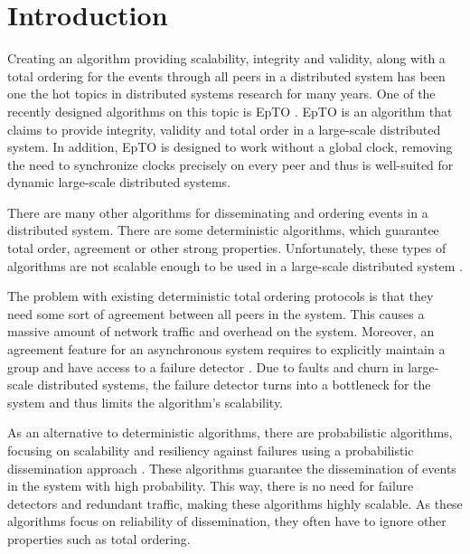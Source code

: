 \documentclass[10pt,conference,a4paper]{IEEEtran}
\begin{document}
\section{Introduction}
Creating an algorithm providing scalability, integrity and validity, along with a total ordering for the events through all peers in a distributed system has been one the hot topics in distributed systems research for many years. One of the recently designed algorithms on this topic is EpTO \autocite{matos2015epto}. EpTO is an algorithm that claims to provide integrity, validity and total order in a large-scale distributed system. In addition, EpTO is designed to work without a global clock, removing the need to synchronize clocks precisely on every peer and thus is well-suited for dynamic large-scale distributed systems.
\par 
There are many other algorithms for disseminating and ordering events in a distributed system. There are some deterministic algorithms, which guarantee total order, agreement or other strong properties. Unfortunately, these types of algorithms are not scalable enough to be used in a large-scale distributed system \autocites[]{defago2004total}[]{lamport1978time}.
\par
The problem with existing deterministic total ordering protocols is that they need some sort of agreement between all peers in the system. This causes a massive amount of network traffic and overhead on the system.
Moreover, an agreement feature for an asynchronous system requires to
explicitly maintain a group and have access to a failure detector \autocites[]{chandra1996weakest}[]{chandra1996unreliable}. Due to faults and churn in large-scale distributed systems, the failure detector turns into a bottleneck for the system and thus limits the algorithm's scalability.
\par
As an alternative to deterministic algorithms, there are probabilistic algorithms, focusing on scalability and resiliency against failures using a probabilistic dissemination approach \autocites []{birman1999bimodal}[]{carvalho2007emergent}[]{demers1987epidemic}[]{eugster2003lightweight}[]{felber2002probabilistic}[]{hayden1996probabilistic}[]{kim2004gossip}[]{Koldehofe02simplegossiping}. These algorithms guarantee the dissemination of events in the system with high probability. This way, there is no need for failure detectors and redundant traffic, making these algorithms highly scalable. As these algorithms focus on reliability of dissemination, they often have to ignore other properties such as total ordering.
\end{document}
